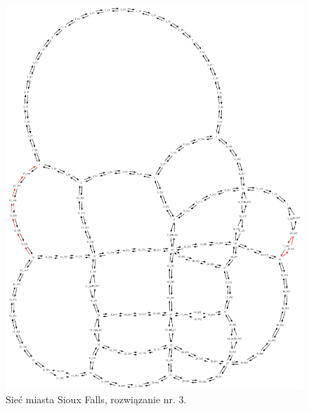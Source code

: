 \documentclass[twoside,12pt]{report}
\begin{document}
\begin{figure}[ht]
\centering
\includegraphics[totalheight=0.580\textheight, angle=90]{img/sioux-out/3/network2}
\caption{Sieć miasta Sioux Falls, rozwiązanie nr. 3.}
\label{sioux3}
\end{figure}
\end{document}
